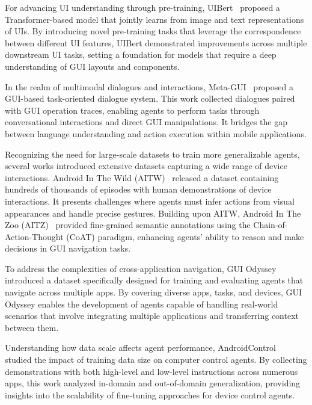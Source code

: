 For advancing UI understanding through pre-training, UIBert~\cite{bai2021uibert} proposed a Transformer-based model that jointly learns from image and text representations of UIs. By introducing novel pre-training tasks that leverage the correspondence between different UI features, UIBert demonstrated improvements across multiple downstream UI tasks, setting a foundation for models that require a deep understanding of GUI layouts and components.

In the realm of multimodal dialogues and interactions, Meta-GUI~\cite{sun2022metagui} proposed a GUI-based task-oriented dialogue system. This work collected dialogues paired with GUI operation traces, enabling agents to perform tasks through conversational interactions and direct GUI manipulations. It bridges the gap between language understanding and action execution within mobile applications.

Recognizing the need for large-scale datasets to train more generalizable agents, several works introduced extensive datasets capturing a wide range of device interactions. Android In The Wild (AITW)~\cite{rawles2024androidinthewild} released a dataset containing hundreds of thousands of episodes with human demonstrations of device interactions. It presents challenges where agents must infer actions from visual appearances and handle precise gestures. Building upon AITW, Android In The Zoo (AITZ)~\cite{zhang2024aitz} provided fine-grained semantic annotations using the Chain-of-Action-Thought (CoAT) paradigm, enhancing agents' ability to reason and make decisions in GUI navigation tasks.

To address the complexities of cross-application navigation, GUI Odyssey~\cite{lu2024guiodyssey} introduced a dataset specifically designed for training and evaluating agents that navigate across multiple apps. By covering diverse apps, tasks, and devices, GUI Odyssey enables the development of agents capable of handling real-world scenarios that involve integrating multiple applications and transferring context between them.

Understanding how data scale affects agent performance, AndroidControl~\cite{li2024androidcontrol} studied the impact of training data size on computer control agents. By collecting demonstrations with both high-level and low-level instructions across numerous apps, this work analyzed in-domain and out-of-domain generalization, providing insights into the scalability of fine-tuning approaches for device control agents.

